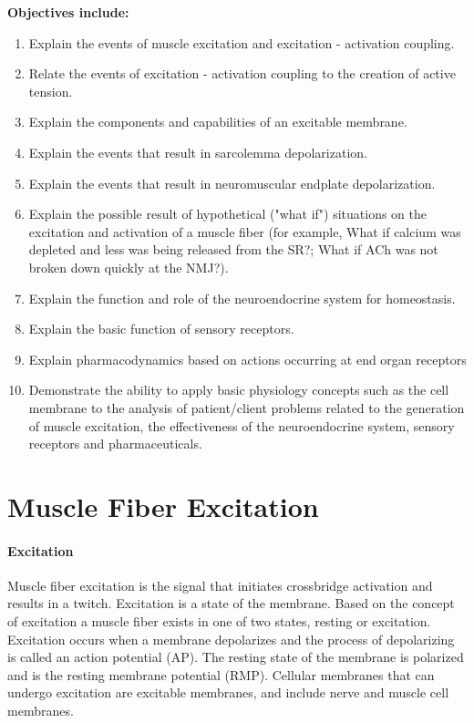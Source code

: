 \vspace{5mm}
\begin{svgraybox}
\textbf{Objectives include:}
\begin{enumerate}
    \item Explain the events of muscle excitation and excitation - activation coupling.
    \item Relate the events of excitation - activation coupling to the creation of active tension.
\item Explain the components and capabilities of an excitable membrane.
    \item Explain the events that result in sarcolemma depolarization.
   \item Explain the events that result in neuromuscular endplate depolarization.
   \item Explain the possible result of hypothetical ("what if") situations on the excitation and activation of a muscle fiber (for example, What if calcium was depleted and less was being released from the SR?; What if ACh was not broken down quickly at the NMJ?).
    \item Explain the function and role of the neuroendocrine system for homeostasis.
\item Explain the basic function of sensory receptors.
    \item Explain pharmacodynamics based on actions occurring at end organ receptors
   \item Demonstrate the ability to apply basic physiology concepts such as the cell membrane to the analysis of patient/client problems related to the generation of muscle excitation, the effectiveness of the neuroendocrine system, sensory receptors and pharmaceuticals.
\end{enumerate}
\end{svgraybox}

\section{Muscle Fiber Excitation} %
\paragraph{Excitation}
Muscle fiber excitation is the signal that initiates crossbridge activation and results in a twitch. Excitation is a state of the membrane. Based on the concept of excitation a muscle fiber exists in one of two states, resting or excitation. Excitation occurs when a membrane depolarizes and the process of depolarizing is called an action potential (AP). The resting state of the membrane is polarized and is the resting membrane potential (RMP). Cellular membranes that can undergo excitation are excitable membranes, and include nerve and muscle cell membranes. 

